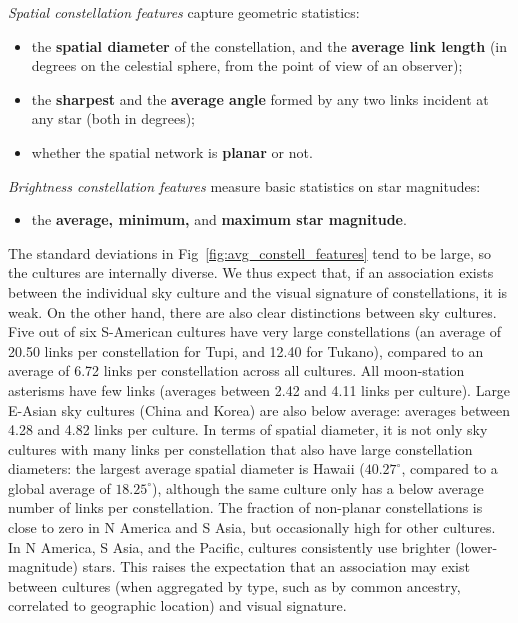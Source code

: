 \documentclass[10pt]{article}
\begin{document}
\emph{Spatial constellation features} capture geometric statistics:
%
\begin{itemize}
	\setlength\itemsep{-1mm}

	\item[$s_{12}$, $s_{13}$] the {\bf spatial diameter} of the constellation, and the {\bf average link length} (in degrees on the celestial sphere, from the point of view of an observer);
	\item[$s_{14}$, $s_{15}$] the {\bf sharpest} and the {\bf average angle} formed by any two links incident at any star (both in degrees);
	\item[$s_{16}$] whether the spatial network is {\bf planar} or not.
\end{itemize}

\emph{Brightness constellation features} measure basic statistics on star magnitudes:
%
\begin{itemize}
	\setlength\itemsep{-1mm}

	\item[$s_{17}$, $s_{18}$, $s_{19}$] the {\bf average, minimum,} and {\bf maximum star magnitude}.
\end{itemize}

The standard deviations in Fig~\ref{fig:avg_constell_features} tend to be large, so the cultures are internally diverse. We thus expect that, if an association exists between the individual sky culture and the visual signature of constellations, it is weak. On the other hand, there are also clear distinctions between sky cultures. Five out of six S-American cultures have very large constellations (an average of 20.50 links per constellation for Tupi, and 12.40 for Tukano), compared to an average of 6.72 links per constellation across all cultures. All moon-station asterisms have few links (averages between 2.42 and 4.11 links per culture). Large E-Asian sky cultures (China and Korea) are also below average: averages between 4.28 and 4.82 links per culture. In terms of spatial diameter, it is not only sky cultures with many links per constellation that also have large constellation diameters: the largest average spatial diameter is Hawaii ($40.27^{\circ}$, compared to a global average of $18.25^{\circ}$), although the same culture only has a below average number of links per constellation. The fraction of non-planar constellations is close to zero in N America and S Asia, but occasionally high for other cultures. In N America, S Asia, and the Pacific, cultures consistently use brighter (lower-magnitude) stars. This raises the expectation that an association may exist between cultures (when aggregated by type, such as by common ancestry, correlated to geographic location) and visual signature.
\end{document}
